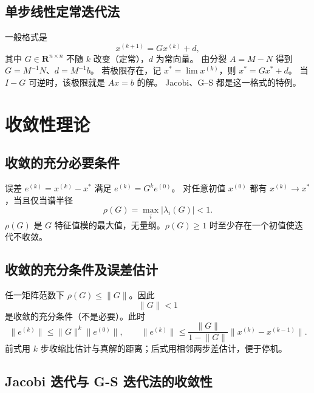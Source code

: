 \subsection{单步线性定常迭代法}

一般格式是
\begin{equation}
x^{(k+1)}=Gx^{(k)}+d,
\end{equation}
其中 \(G\in\mathbf{R}^{n\times n}\) 不随 \(k\) 改变（定常），\(d\) 为常向量。
由分裂 \(A=M-N\) 得到 \(G=M^{-1}N\)、\(d=M^{-1}b\)。
若极限存在，记 \(x^{*}=\lim x^{(k)}\)，则 \(x^{*}=Gx^{*}+d\)。
当 \(I-G\) 可逆时，该极限就是 \(Ax=b\) 的解。
Jacobi、G--S 都是这一格式的特例。

\section{收敛性理论}

\subsection{收敛的充分必要条件}

误差 \(e^{(k)}=x^{(k)}-x^{*}\) 满足 \(e^{(k)}=G^k e^{(0)}\)。
对任意初值 \(x^{(0)}\) 都有 \(x^{(k)}\to x^{*}\)，当且仅当谱半径
\begin{equation}
\rho(G)=\max_i\lvert\lambda_i(G)\rvert<1.
\end{equation}
\(\rho(G)\) 是 \(G\) 特征值模的最大值，无量纲。\(\rho(G)\ge 1\) 时至少存在一个初值使迭代不收敛。

\subsection{收敛的充分条件及误差估计}

任一矩阵范数下 \(\rho(G)\le\lVert G\rVert\)。因此
\begin{equation}
\lVert G\rVert<1
\end{equation}
是收敛的充分条件（不是必要）。此时
\begin{equation}
\lVert e^{(k)}\rVert\le\lVert G\rVert^k\lVert e^{(0)}\rVert,
\qquad
\lVert e^{(k)}\rVert\le\frac{\lVert G\rVert}{1-\lVert G\rVert}\lVert x^{(k)}-x^{(k-1)}\rVert.
\end{equation}
前式用 \(k\) 步收缩比估计与真解的距离；后式用相邻两步差估计，便于停机。

\subsection{Jacobi 迭代与 G-S 迭代法的收敛性}

